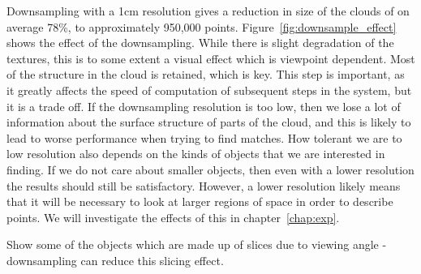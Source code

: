 \documentclass[11pt,a4paper]{kth-mag}
\begin{document}
Downsampling with a 1cm resolution gives a reduction in size of the clouds of on
average 78\%, to approximately 950,000 points.
Figure~\ref{fig:downsample_effect} shows the effect of the downsampling. While
there is slight degradation of the textures, this is to some extent a visual
effect which is viewpoint dependent. Most of the structure in the cloud is
retained, which is key. This step is important, as it greatly affects the speed
of computation of subsequent steps in the system, but it is a trade off. If the
downsampling resolution is too low, then we lose a lot of information about the
surface structure of parts of the cloud, and this is likely to lead to worse
performance when trying to find matches. How tolerant we are to low resolution
also depends on the kinds of objects that we are interested in finding. If we do
not care about smaller objects, then even with a lower resolution the results
should still be satisfactory. However, a lower resolution likely means that it
will be necessary to look at larger regions of space in order to describe
points. We will investigate the effects of this in chapter~\ref{chap:exp}.

Show some of the objects which are made up of slices due to viewing angle -
downsampling can reduce this slicing effect.
\end{document}
